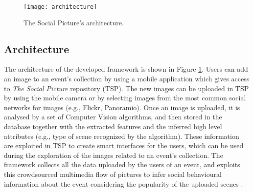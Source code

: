 \begin{figure}[t]
	\centering
	\texttt{[image: architecture]}
	\caption{The Social Picture's architecture.}
	\label{architecture}
\end{figure}
\subsection{Architecture}
The architecture of the developed framework is shown in Figure \ref{architecture}.
Users can add an image to an event's collection by using a mobile application which gives access to \textit{The Social Picture} repository (TSP). The new images can be uploaded in TSP by using the mobile camera or by selecting images from the most common social networks for images (e.g., Flickr, Panoramio).
Once an image is uploaded, it is analysed by a set of Computer Vision algorithms, and then stored in the database together with the extracted features and the inferred high level attributes (e.g., type of scene recognized by the algorithm). These information are exploited in TSP to create smart interfaces for the users, which can be used during the exploration of the images related to an event's collection.
The framework collects all the data uploaded by the users of an event, and exploits this crowdsourced multimedia flow of pictures to infer social behavioural information about the event considering the popularity of the uploaded scenes \cite{Ortis2015n525}.

